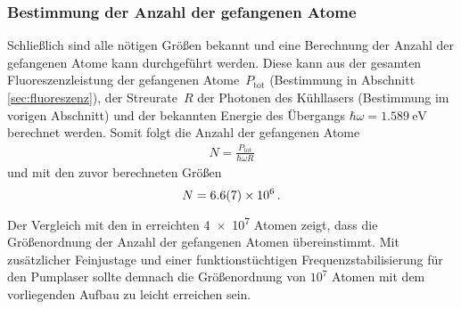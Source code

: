 \documentclass[11pt, a4paper]{article}
\numberwithin{equation}{section}
\begin{document}
\subsubsection{Bestimmung der Anzahl der gefangenen Atome}
\label{sec:atomzahl}
Schließlich sind alle nötigen Größen bekannt und eine Berechnung der Anzahl der gefangenen Atome kann durchgeführt werden.
Diese kann aus der gesamten Fluoreszenzleistung der gefangenen Atome~$P_\mathrm{tot}$ (Bestimmung in Abschnitt \ref{sec:fluoreszenz}), der Streurate~$R$ der Photonen des Kühllasers (Bestimmung im vorigen Abschnitt) und der bekannten Energie des Übergangs $\hbar \omega = \SI{1.589}{\electronvolt}$ \cite{steck} berechnet werden.
Somit folgt die Anzahl der gefangenen Atome
\begin{align*}
	N = \frac{P_\mathrm{tot}}{\hbar \omega R}
\end{align*}
und mit den zuvor berechneten Größen
\begin{align*}
	N = \num{6.6 +- 0.7e6} \, \text{.}
\end{align*}
Der Vergleich mit den in \cite{wieman} erreichten \num{4e7} Atomen zeigt, dass die Größenordnung der Anzahl der gefangenen Atomen übereinstimmt.
Mit zusätzlicher Feinjustage und einer funktionstüchtigen Frequenzstabilisierung für den Pumplaser sollte demnach die Größenordnung von $10^7$ Atomen mit dem vorliegenden Aufbau zu leicht erreichen sein.
\end{document}
